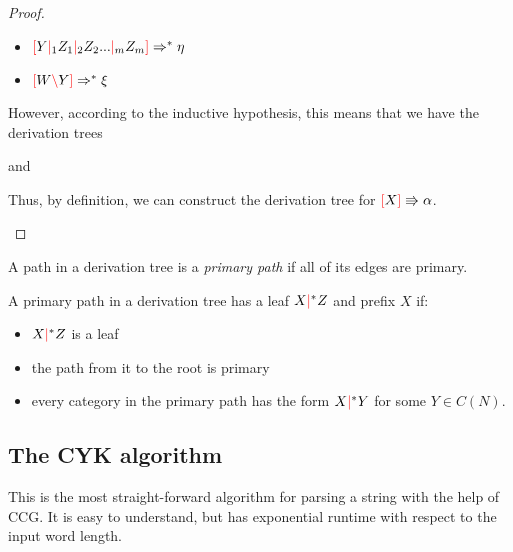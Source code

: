 \documentclass[main.tex]{subfiles}
\begin{document}
\begin{proof}
\begin{itemize}
\begin{itemize}
                \item $\textcolor{red}{[} Y \textcolor{red}{|}_1 Z_1 \textcolor{red}{|}_2 Z_2 ... \textcolor{red}{|}_m Z_m \textcolor{red}{]} \Rightarrow^* \eta$
                \item $\textcolor{red}{[} W \textcolor{red}{\backslash} Y \textcolor{red}{]} \Rightarrow^* \xi$
            \end{itemize}
            However, according to the inductive hypothesis, this means that we
            have the derivation trees
            \begin{center}
                and
            \end{center}
            Thus, by definition, we can construct the derivation tree
            for $\textcolor{red}{[} X \textcolor{red}{]} \Rrightarrow \alpha$.
    \end{itemize}
\end{proof}

\begin{defn}
    A path in a derivation tree is a \emph{primary path} if all of its edges
    are primary.
\end{defn}

\begin{defn}
    A primary path in a derivation tree has a leaf $X \textcolor{red}{|}^* Z$ and prefix $X$
    if:
    \begin{itemize}
        \item $X \textcolor{red}{|}^* Z$ is a leaf
        \item the path from it to the root is primary
        \item every category in the primary path has the form $X \textcolor{red}{|}^* Y$
            for some $Y \in C(N)$.
    \end{itemize}
\end{defn}

\begin{property}

\end{property}

\subsection{The CYK algorithm}

This is the most straight-forward algorithm for parsing a string with the help
of CCG. It is easy to understand, but has exponential runtime with respect to
the input word length.
\end{document}

